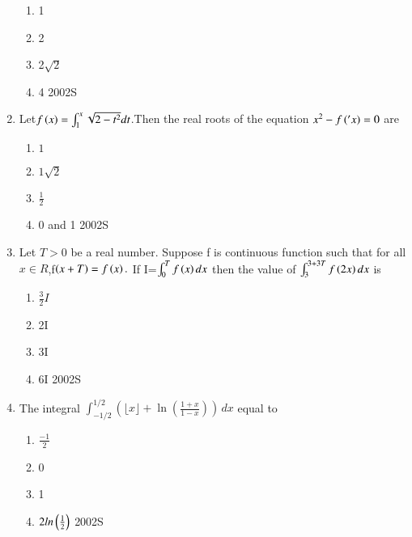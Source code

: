 \documentclass[journal,12pt,twocolumn]{IEEEtran}
\theoremstyle{remark}
\begin{document}
\begin{enumerate}
\begin{enumerate}
 \item  1
 \item  2
 \item  2$\sqrt{2}$
 \item  4
 \hfill{{2002S}}
\end{enumerate}
\item Let$f\left(x\right)=\int_{1}^{x}\sqrt{2-{t}^2} dt $.Then the real roots of the equation ${x}^2-f\left('x\right)=0$ are 
\begin{enumerate}
  \item ${1}$
  \item ${1}{\sqrt2}$
  \item $\frac{1}{2}$
   \item 0 and 1
   \hfill{{2002S}}
   \end{enumerate}
   \item Let $T>0$ be a real number. Suppose f is continuous function such that for all ${x}\in{R}$,f$\left(x+T\right)=f\left(x\right).$
   If I=$\int_{0}^{T}f\left(x\right)dx$ then the value of $\int_{3}^{3+3T} f\left(2x\right) dx $ is
\begin{enumerate}
	\item $\frac{3}{2}{I}$
   \item 2I
   \item 3I
   \item 6I
   \hfill{{2002S}}
   \end{enumerate}
   \item The integral $\int_{-1/2}^{1/2} \left( \lfloor x \rfloor + \ln \left( \frac{1+x}{1-x} \right) \right) \, dx$ equal to
\begin{enumerate}[label=(\alph*)]
	\item $\frac{-1}{2}$
 \item 0
 \item 1
 \item $2ln\left(\frac{1}{2}\right)$
 \hfill{2002S}
 \end{enumerate}




\end{enumerate}
\end{document}
